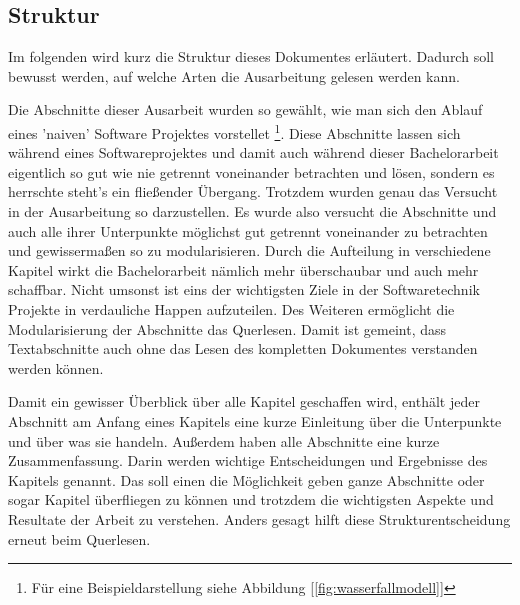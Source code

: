 \subsection{Struktur}\label{kapitel_struktur}\myCheckmark
Im folgenden wird kurz die Struktur dieses Dokumentes erläutert. Dadurch soll bewusst werden, auf welche Arten die Ausarbeitung gelesen werden kann.

\myNewSection%
Die Abschnitte dieser Ausarbeit wurden so gewählt, wie man sich den Ablauf eines 'naiven' Software Projektes vorstellet \footnote{Für eine Beispieldarstellung siehe Abbildung [\ref{fig:wasserfallmodell}]}. Diese Abschnitte lassen sich während eines Softwareprojektes und damit auch während dieser Bachelorarbeit eigentlich so gut wie nie getrennt voneinander betrachten und lösen, sondern es herrschte steht's ein fließender Übergang. Trotzdem wurden genau das Versucht in der Ausarbeitung so darzustellen. Es wurde also versucht die Abschnitte und auch alle ihrer Unterpunkte möglichst gut getrennt voneinander zu betrachten und gewissermaßen so zu modularisieren.\newline%
Durch die Aufteilung in verschiedene Kapitel wirkt die Bachelorarbeit nämlich mehr überschaubar und auch mehr schaffbar. Nicht umsonst ist eins der wichtigsten Ziele in der Softwaretechnik Projekte in verdauliche Happen aufzuteilen. Des Weiteren ermöglicht die Modularisierung der Abschnitte das \dq Querlesen\dq. Damit ist gemeint, dass Textabschnitte auch ohne das Lesen des kompletten Dokumentes verstanden werden können. 

\myNewSection
Damit ein gewisser Überblick über alle Kapitel geschaffen wird, enthält jeder Abschnitt am Anfang eines Kapitels eine kurze Einleitung über die Unterpunkte und über was sie handeln.\newline%
Außerdem haben alle Abschnitte eine kurze Zusammenfassung. Darin werden wichtige Entscheidungen und Ergebnisse des Kapitels genannt. Das soll einen die Möglichkeit geben ganze Abschnitte oder sogar Kapitel überfliegen zu können und trotzdem die wichtigsten Aspekte und Resultate der Arbeit zu verstehen. Anders gesagt hilft diese Strukturentscheidung erneut beim Querlesen.